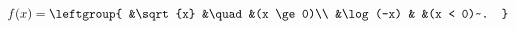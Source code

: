 
\begin{issues}
\issueDraft
\end{issues}

\begin{equation}
f(x) = \leftgroup{
    &\sqrt{x} &\quad &(x \ge 0)\\
    &\log(-x) & &(x < 0)~.
}
\end{equation}
